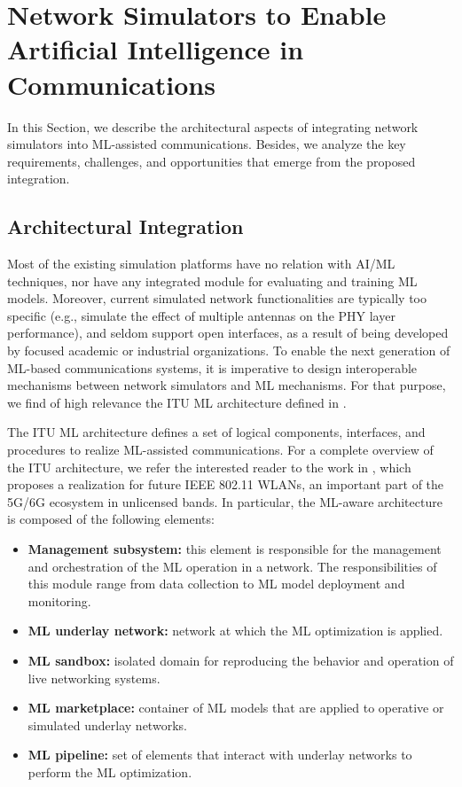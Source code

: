 \documentclass[journal]{IEEEtran}
\begin{document}
	\section{Network Simulators to Enable Artificial Intelligence in Communications}	
	In this Section, we describe the architectural aspects of integrating network simulators into ML-assisted communications. Besides, we analyze the key requirements, challenges, and opportunities that emerge from the proposed integration.
	
	\subsection{Architectural Integration}
	Most of the existing simulation platforms have no relation with AI/ML techniques, nor have any integrated module for evaluating and training ML models. Moreover, current simulated network functionalities are typically too specific (e.g., simulate the effect of multiple antennas on the PHY layer performance), and seldom support open interfaces, as a result of being developed by focused academic or industrial organizations. To enable the next generation of ML-based communications systems, it is imperative to design interoperable mechanisms between network simulators and ML mechanisms. For that purpose, we find of high relevance the ITU ML architecture defined in \cite{ITU3172}.	
	
	The ITU ML architecture defines a set of logical components, interfaces, and procedures to realize ML-assisted communications. For a complete overview of the ITU architecture, we refer the interested reader to the work in \cite{itu_architecture}, which proposes a realization for future IEEE 802.11 WLANs, an important part of the 5G/6G ecosystem in unlicensed bands. In particular, the ML-aware architecture is composed of the following elements:
	\begin{itemize}
		\item \textbf{Management subsystem:} this element is responsible for the management and orchestration of the ML operation in a network. The responsibilities of this module range from data collection to ML model deployment and monitoring.
		\item \textbf{ML underlay network:} network at which the ML optimization is applied.
		\item \textbf{ML sandbox:} isolated domain for reproducing the behavior and operation of live networking systems.		
		\item \textbf{ML marketplace:} container of ML models that are applied to operative or simulated underlay networks.
		\item \textbf{ML pipeline:} set of elements that interact with underlay networks to perform the ML optimization. 
	\end{itemize} 
	
\end{document}
